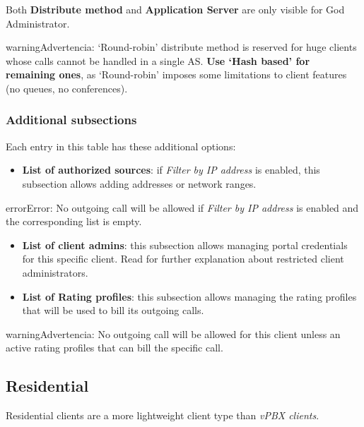 \documentclass[letterpaper,10pt,spanish]{sphinxmanual}
\begin{document}
Both \textbf{Distribute method} and \textbf{Application Server} are only visible for God
Administrator.

\begin{notice}{warning}{Advertencia:}
`Round-robin' distribute method is reserved for huge clients
whose calls cannot be handled in a single AS. \textbf{Use `Hash based'
for remaining ones}, as `Round-robin' imposes some limitations
to client features (no queues, no conferences).
\end{notice}


\subsubsection{Additional subsections}
\label{administration_portal/brand/clients/virtual_pbx:additional-subsections}
Each entry in this table has these additional options:
\begin{itemize}
\item {} 
\textbf{List of authorized sources}: if \emph{Filter by IP address} is enabled, this subsection allows adding addresses or network ranges.

\end{itemize}

\begin{notice}{error}{Error:}
No outgoing call will be allowed if \emph{Filter by IP address} is enabled and the corresponding list is empty.
\end{notice}
\begin{itemize}
\item {} 
\textbf{List of client admins}: this subsection allows managing portal credentials for this specific client. Read {\hyperref[api_rest/acls:acls]{}}
for further explanation about restricted client administrators.

\item {} 
\textbf{List of Rating profiles}: this subsection allows managing the rating profiles that will be used to bill its outgoing calls.

\end{itemize}

\begin{notice}{warning}{Advertencia:}
No outgoing call will be allowed for this client unless an active rating profiles that can
bill the specific call.
\end{notice}


\subsection{Residential}
\label{administration_portal/brand/clients/residential:residential}\label{administration_portal/brand/clients/residential::doc}
Residential clients are a more lightweight client type than \emph{vPBX clients}.
\end{document}
